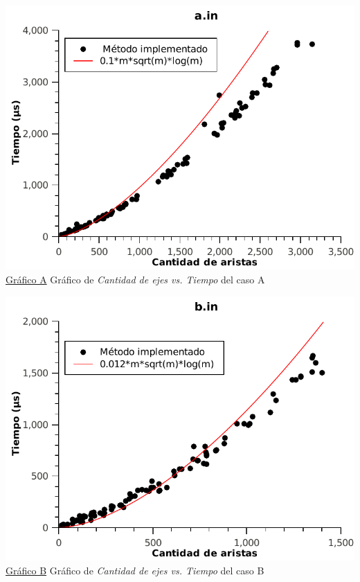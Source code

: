 \begin{center}
\vspace*{1.5cm}
\hspace*{-2.1cm}\includegraphics[scale = 0.9]{../ej2/pruebas_graficos/GraphA.pdf} \\
\underline{Gráfico A} Gráfico de \textit{Cantidad de ejes vs. Tiempo} del caso A

\vspace*{1.5cm}
\hspace*{-2.1cm}\includegraphics[scale = 0.9]{../ej2/pruebas_graficos/GraphB.pdf} \\
\underline{Gráfico B} Gráfico de \textit{Cantidad de ejes vs. Tiempo} del caso B


\end{center}
